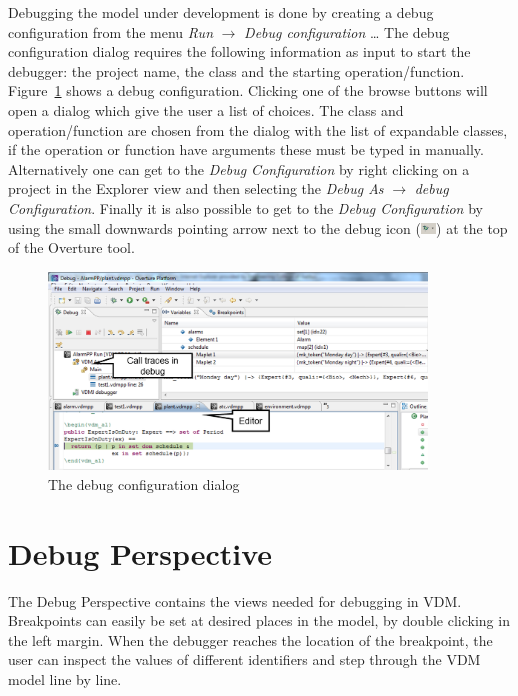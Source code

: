 \documentclass{overturerepchap}
\begin{document}
Debugging the model under development is done by creating a debug configuration
from the menu \emph{Run} $\rightarrow $ \emph{Debug configuration}
\ldots 
The debug
configuration dialog requires the following information as input to start the
debugger: the project name, the class and the starting operation/function.
Figure~\ref{fig:userguide:debugConfiguration} shows a debug configuration.
Clicking one of the browse buttons will open a dialog which give the user a list
of choices. The class and operation/function are chosen from the dialog with the
list of expandable classes, if the operation or function have arguments these
must be typed in manually. Alternatively one can get to the
\emph{Debug Configuration} by right clicking on a project in the
Explorer view and then selecting the \emph{Debug As} $\rightarrow$
\emph{debug Configuration}. Finally it is also possible to get to the
\emph{Debug Configuration} by using the small downwards pointing arrow
next to the debug icon
(\includegraphics[width=0.03\textwidth]{icons/debuggericon}) at the
top of the Overture tool. 

\begin{figure}[htp]
\begin{center}
  \includegraphics[width=380px]{figures/debugConfiguration}
  \caption{The debug configuration dialog}
  \label{fig:userguide:debugConfiguration}
\end{center}
\end{figure}

\section{Debug Perspective}

The Debug Perspective contains the views
needed for debugging in VDM. Breakpoints can easily be set at desired
places in the model, by double clicking in the left margin. When the
debugger reaches the location of the breakpoint, the user can inspect
the values of different identifiers and step through the VDM model
line by line.
 
\end{document}
